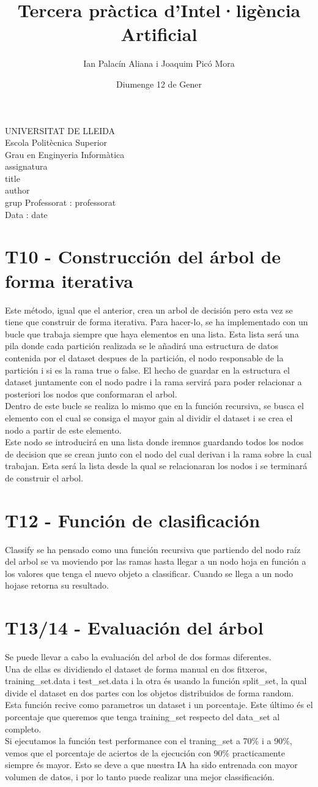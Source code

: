 \documentclass{article}
\title{Tercera pràctica d'Intel·ligència Artificial}
\author{Ian Palacín Aliana i Joaquim Picó Mora}
\date{Diumenge 12 de Gener}
\renewcommand{\maketitle}{ %
    \begin{titlepage}
        \raggedright{UNIVERSITAT DE LLEIDA \\
            Escola Politècnica Superior \\
            Grau en Enginyeria Informàtica\\
            \1assignatura\\}
            \vspace{5cm}
            \centering\huge{\5title \\}
            \vspace{3cm}
            \large{\6author} \\
            \normalsize{\3grup}
            \vfill
            Professorat : \4professorat \\
            Data : \7date
\end{titlepage}}
\begin{document}
\maketitle
\thispagestyle{empty}

\newpage
{}
\tableofcontents
\newpage
{}
%
\section{T10 - Construcción del árbol de forma iterativa}
%
Este método, igual que el anterior, crea un arbol de decisión pero
esta vez se tiene que construir de forma iterativa. Para hacer-lo, se
ha implementado con un bucle que trabaja siempre que haya elementos en 
una lista. Esta lista será una pila donde cada partición realizada
se le añadirá una estructura de datos contenida por el dataset despues
de la partición, el nodo responsable de la partición i si es la rama
true o false. El hecho de guardar en la estructura el dataset juntamente con 
el nodo padre i la rama servirá para poder relacionar a posteriori los nodos
que conformaran el arbol.\\
Dentro de este bucle se realiza lo mismo que en la función recursiva, se busca
el elemento con el cual se consiga el mayor gain al dividir el dataset i
se crea el nodo a partir de este elemento.\\
Este nodo se introducirá en una lista donde iremnos guardando todos los 
nodos de decision que se crean junto con el nodo del cual derivan 
i la rama sobre la cual trabajan. Esta será la lista desde la qual se 
relacionaran los nodos i se terminará de construir el arbol.
%
\section{T12 - Función de clasificación}
Classify se ha pensado como una función recursiva que partiendo del nodo raíz
del arbol se va moviendo por las ramas hasta llegar a un nodo hoja en función
a los valores que tenga el nuevo objeto a classificar. Cuando se llega a un nodo 
hojase retorna su resultado.
\section{T13/14 - Evaluación del árbol}
Se puede llevar a cabo la evaluación del arbol de dos formas diferentes.\\ 
Una de ellas es dividiendo el dataset de forma manual en dos fitxeros, training\_set.data i test\_set.data i la otra és usando la función split\_set, la qual divide el dataset en dos partes con los objetos distribuidos de forma random. Esta función recive como parametros un dataset i un porcentaje. Este último és el porcentaje que queremos que tenga training\_set respecto del data\_set al completo.\\
Si ejecutamos la función test performance con el traning\_set a 70\% i a 90\%, vemos que el porcentaje de aciertos de la ejecución con 90\% practicamente siempre és mayor. Esto se deve a que nuestra IA ha sido entrenada con mayor volumen de datos, i por lo tanto puede realizar una mejor classificación.
%
\end{document}
